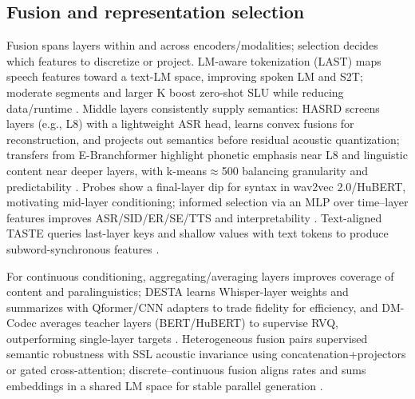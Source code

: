 \documentclass{article}
\begin{document}
\subsection{Fusion and representation selection} \label{subsec:Fusion and representation selection}
Fusion spans layers within and across encoders/modalities; selection decides which features to discretize or project. LM-aware tokenization (LAST) maps speech features toward a text-LM space, improving spoken LM and S2T; moderate segments and larger K boost zero-shot SLU while reducing data/runtime \cite{turetzky2024lastlanguagemodelawarespeechtokenization,kando2025exploringeffectsegmentationvocabularysiz}. Middle layers consistently supply semantics: HASRD screens layers (e.g., L8) with a lightweight ASR head, learns convex fusions for reconstruction, and projects out semantics before residual acoustic quantization; transfers from E-Branchformer highlight phonetic emphasis near L8 and linguistic content near deeper layers, with k-means$\approx$500 balancing granularity and predictability \cite{hussein2025hasrdhierarchicalacousticsemanticreprese,chen2023reducingbarriersselfsupervisedlearninghu}. Probes show a final-layer dip for syntax in wav2vec 2.0/HuBERT, motivating mid-layer conditioning; informed selection via an MLP over time--layer features improves ASR/SID/ER/SE/TTS and interpretability \cite{shen2023wavesyntaxprobingspokenlanguagemodels,mousavi2024howshouldweextractdiscreteaudiotokenssel}. Text-aligned TASTE queries last-layer keys and shallow values with text tokens to produce subword-synchronous features \cite{tseng2025tastetextalignedspeechtokenizationembedd}.

For continuous conditioning, aggregating/averaging layers improves coverage of content and paralinguistics; DESTA learns Whisper-layer weights and summarizes with Qformer/CNN adapters to trade fidelity for efficiency, and DM-Codec averages teacher layers (BERT/HuBERT) to supervise RVQ, outperforming single-layer targets \cite{lu2024destaenhancingspeechlanguagemodelsthroug,ahasan2025dmcodecdistillingmultimodalrepresentatio}. Heterogeneous fusion pairs supervised semantic robustness with SSL acoustic invariance using concatenation+projectors or gated cross-attention; discrete--continuous fusion aligns rates and sums embeddings in a shared LM space for stable parallel generation \cite{mei2025shnumultilingualconversationalspeechreco,lin2025dkusystemmultispeakerautomaticspeechreco,tan2025drvoiceparallelspeechtextvoiceconversati}.
\end{document}
